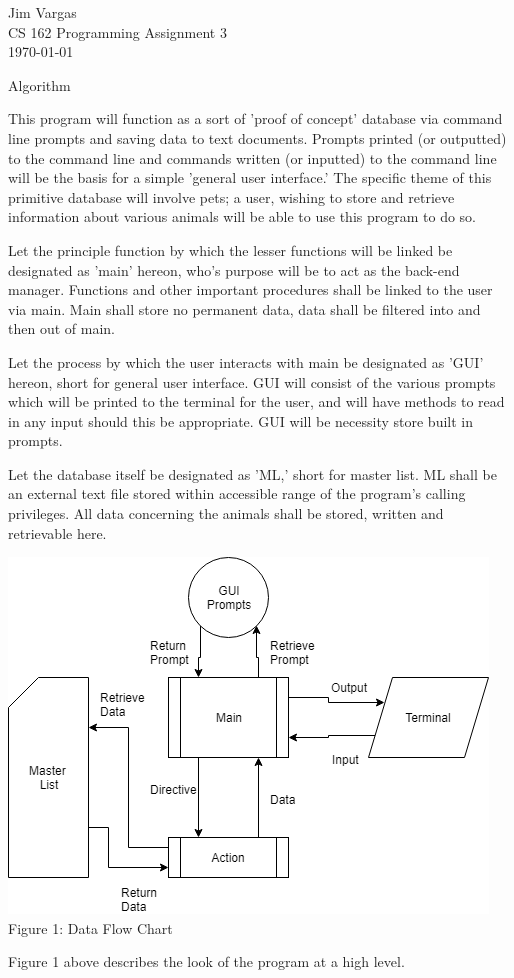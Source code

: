 \documentclass[12]{article}
\begin{document}
\noindent
\onehalfspacing
Jim Vargas \\
CS 162 Programming Assignment 3 \\
\today \\

\begin{center}
Algorithm
\end{center}

	This program will function as a sort of 'proof of concept' database via command line prompts and saving data to text documents. Prompts printed (or outputted) to the command line and commands written (or inputted) to the command line will be the basis for a simple 'general user interface.' The specific theme of this primitive database will involve pets; a user, wishing to store and retrieve information about various animals will be able to use this program to do so.
	
	Let the principle function by which the lesser functions will be linked be designated as 'main' hereon, who's purpose will be to act as the back-end manager. Functions and other important procedures shall be linked to the user via main. Main shall store no permanent data, data shall be filtered into and then out of main.
		
	Let the process by which the user interacts with main be designated as 'GUI' hereon, short for general user interface. GUI will consist of the various prompts which will be printed to the terminal for the user, and will have methods to read in any input should this be appropriate. GUI will be necessity store built in prompts.
	
	Let the database itself be designated as 'ML,' short for master list. ML shall be an external text file stored within accessible range of the program's calling privileges. All data concerning the animals shall be stored, written and retrievable here.
	
\begin{center}
\includegraphics[scale=.8]{data_chart.png}\\
Figure 1: Data Flow Chart
\end{center}

	Figure 1 above describes the look of the program at a high level.
\end{document}
